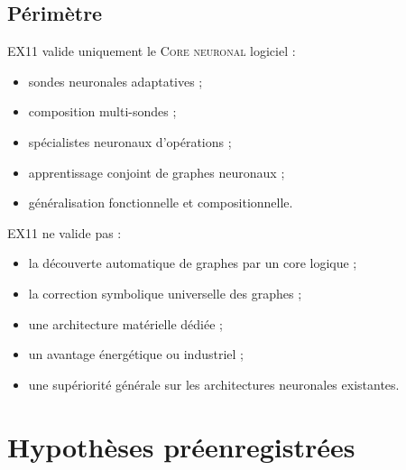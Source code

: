 \documentclass[11pt,a4paper]{article}
\newcommand{\CoreN}{\textsc{Core neuronal}}
\begin{document}
\subsection{Périmètre}

EX11 valide uniquement le \CoreN{} logiciel :
\begin{itemize}
  \item sondes neuronales adaptatives ;
  \item composition multi-sondes ;
  \item spécialistes neuronaux d'opérations ;
  \item apprentissage conjoint de graphes neuronaux ;
  \item généralisation fonctionnelle et compositionnelle.
\end{itemize}

EX11 ne valide pas :
\begin{itemize}
  \item la découverte automatique de graphes par un core logique ;
  \item la correction symbolique universelle des graphes ;
  \item une architecture matérielle dédiée ;
  \item un avantage énergétique ou industriel ;
  \item une supériorité générale sur les architectures neuronales existantes.
\end{itemize}

\section{Hypothèses préenregistrées}
\end{document}
